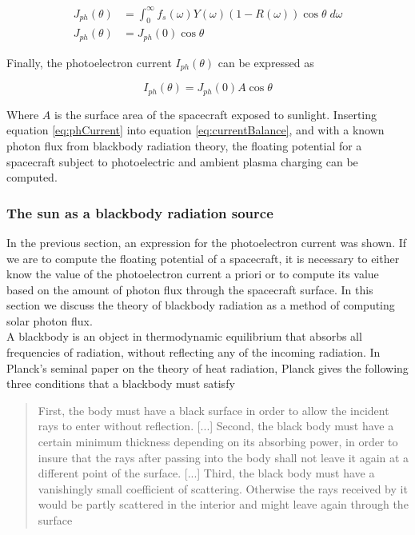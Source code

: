 \begin{subequations}
    \begin{align}
        J_{ph}(\theta) &= \int^\infty_0 f_s(\omega) Y(\omega)(1 - R(\omega)) \cos \theta \; d\omega \\
        J_{ph}(\theta) &= J_{ph}(0) \cos \theta
    \end{align}
\end{subequations}


Finally, the photoelectron current $I_{ph}(\theta)$ can be expressed as 

\begin{equation}\label{eq:phCurrent}
    I_{ph}(\theta) = J_{ph}(0) A \cos \theta 
\end{equation}

Where $A$ is the surface area of the spacecraft exposed to sunlight. Inserting equation \ref{eq:phCurrent} into equation \ref{eq:currentBalance}, and with a known photon flux from blackbody radiation theory, the floating potential for a spacecraft subject to photoelectric and ambient plasma charging can be computed.

\subsubsection*{The sun as a blackbody radiation source}
In the previous section, an expression for the photoelectron current was shown. If we are to compute the floating potential of a spacecraft, it is necessary to either know the value of the photoelectron current a priori or to compute its value based on the amount of photon flux through the spacecraft surface. In this section we discuss the theory of blackbody radiation as a method of computing solar photon flux.
\\
A blackbody is an object in thermodynamic equilibrium that absorbs all frequencies of radiation, without reflecting any of the incoming radiation. In Planck's seminal paper on the theory of heat radiation, Planck gives the following three conditions that a blackbody must satisfy 

\begin{quote}
    First, the body must have a black surface in order to allow the incident rays to enter without reflection. [...] Second, the black body must have a certain minimum thickness depending on its absorbing power, in order to insure that the rays after passing into the body shall not leave it again at a different point of the surface. [...] Third, the black body must have a vanishingly small coefficient of scattering. Otherwise the rays received by it would be partly scattered in the interior and might leave again through the surface
\end{quote}

